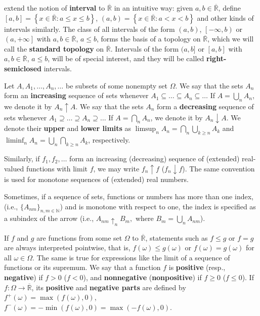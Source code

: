 extend the notion of \textbf{interval} to \(\overline{\mathbb{R}}\) in an
intuitive way: given \(a,b\in\overline{\mathbb{R}}\), define
\(\left[a,b\right]=\left\{x\in\overline{\mathbb{R}}\colon a\leq x\leq b\right\}\),
\(\left(a,b\right)=\left\{x\in\overline{\mathbb{R}}\colon a<x<b\right\}\) and
other kinds of intervals similarly. The class of all intervals of the
form \(\left(a,b\right)\), \(\left[-\infty,b\right)\) or \(\left(a,+\infty\right]\) with
\(a,b\in\overline{\mathbb{R}}\), \(a\leq b\), forms the basis of a topology on
\(\overline{\mathbb{R}}\), which we will call the \textbf{standard topology} on
\(\overline{\mathbb{R}}\). Intervals of the form \((a,b]\) or
\([a,b]\) with \(a,b\in\overline{\mathbb{R}}\), \(a\leq b\), will be of special interest,
and they will be called \textbf{right-semiclosed} intervals.

Let \(A, A_1,\dots,A_n,\dots\) be subsets of some nonempty set \(\Omega\). We say
that the sets \(A_n\) form an \textbf{increasing} sequence of sets whenever
\(A_1\subseteq\dots\subseteq A_n\subseteq\dots\) If \(A=\bigcup_nA_n\), we
denote it by \(A_n\uparrow A\).  We say that the sets \(A_n\) form a
\textbf{decreasing} sequence of sets whenever
\(A_1\supseteq\dots\supseteq A_n\supseteq\dots\) If \(A=\bigcap_nA_n\), we
denote it by \(A_n\downarrow A\).	We denote their \textbf{upper} and \textbf{lower limits} as
\(\limsup_{n}A_{n}=\bigcap_{n}\bigcup_{k\geq n}A_{k}\) and
\(\liminf_{n}A_{n}=\bigcup_{n}\bigcap_{k\geq n}A_{k}\), respectively.

Similarly, if \(f_1,f_2,\dots\) form an increasing (decreasing) sequence of (extended) real-valued functions
with limit \(f\), we may write \(f_n\uparrow f\) (\(f_n\downarrow f\)). The same
convention is used for monotone sequences of (extended) real numbers.
	
Sometimes, if a sequence of sets, functions or numbers has more than
one index, (i.e., \(\{A_{nm}\}_{n,m\in\mathbb{N}}\)) and is monotone with
respect to one, the index is specified as a subindex of the arrow (i.e.,
\(A_{nm}\uparrow_{n}B_{m}, \) where \(B_{m}=\bigcup_{n}A_{nm}\)).
	
If \(f\) and \(g\) are functions from some set \(\Omega\) to \(\overline{\mathbb{R}}\),
statements such as \(f\leq g\) or \(f=g\) are always interpreted pointwise, that
is, \(f(\omega)\leq g(\omega)\) or \(f(\omega)=g(\omega)\) for all
\(\omega\in\Omega\). The same is true for expressions like the limit of a
sequence of functions or its supremum. We say that a function \(f\) is
\textbf{positive} (resp., \textbf{negative}) if \(f>0\) (\(f<0\)), and
\textbf{nonnegative} (\textbf{nonpositive}) if \(f\geq0\) (\(f\leq0\)). If \(f\colon\Omega\to\overline{\mathbb{R}}\), its \textbf{positive}
and \textbf{negative parts} are defined by \(f^+(\omega)=\max(f(\omega),0)\),
\(f^-(\omega)=-\min(f(\omega),0)=\max(-f(\omega),0)\).

